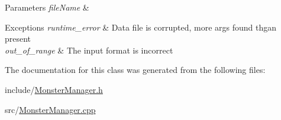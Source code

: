 \begin{DoxyParams}{Parameters}
{\em file\+Name} & \\
\hline
\end{DoxyParams}

\begin{DoxyExceptions}{Exceptions}
{\em runtime\+\_\+error} & Data file is corrupted, more args found thgan present \\
\hline
{\em out\+\_\+of\+\_\+range} & The input format is incorrect \\
\hline
\end{DoxyExceptions}


The documentation for this class was generated from the following files\+:\begin{DoxyCompactItemize}
\item 
include/\hyperlink{MonsterManager_8h}{Monster\+Manager.\+h}\item 
src/\hyperlink{MonsterManager_8cpp}{Monster\+Manager.\+cpp}\end{DoxyCompactItemize}
